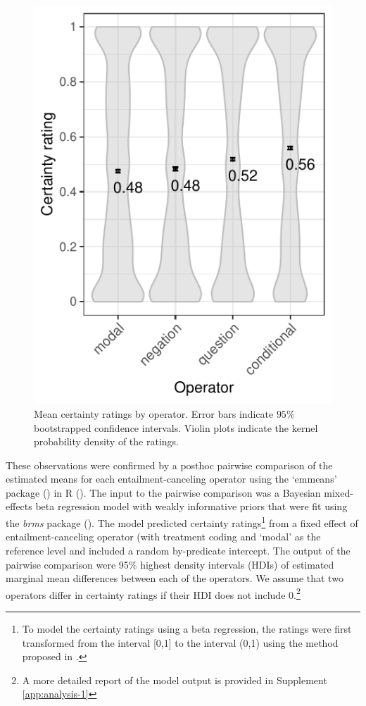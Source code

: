 \documentclass[a4paper,12pt,twoside]{article}
\begin{document}
            \begin{figure}[ht]
				\centering
				\includegraphics[scale = .8]{certainty-operator.pdf}
				\caption{Mean certainty ratings by operator. Error bars indicate $95\%$ bootstrapped confidence intervals. Violin plots indicate the kernel probability density of the ratings.
                }
				\label{fig:op-ratings}
			\end{figure}

   These observations were confirmed by a posthoc pairwise comparison of the estimated means for each entailment-canceling operator using the `emmeans' package (\citealt{emmeans}) in R (\citealt{r}). The input to the pairwise comparison was a  Bayesian mixed-effects beta regression model with weakly informative priors that were fit using the \emph{brms} package (\citealt{buerkner2017}). The model predicted certainty ratings\footnote{To model the certainty ratings using a beta regression, the ratings were first transformed from the interval [0,1] to the interval (0,1) using the method proposed in \citealt{smithson-verkuilen2006}.} from a fixed effect of entailment-canceling operator (with treatment coding and `modal' as the reference level and included a random by-predicate intercept. The output of the pairwise comparison were 95\% highest density intervals (HDIs) of estimated marginal mean differences between each of the operators. We assume that two operators differ in certainty ratings if their HDI does not include 0.\footnote{A more detailed report of the model output is provided in Supplement \ref{app:analysis-1}}
\end{document}
